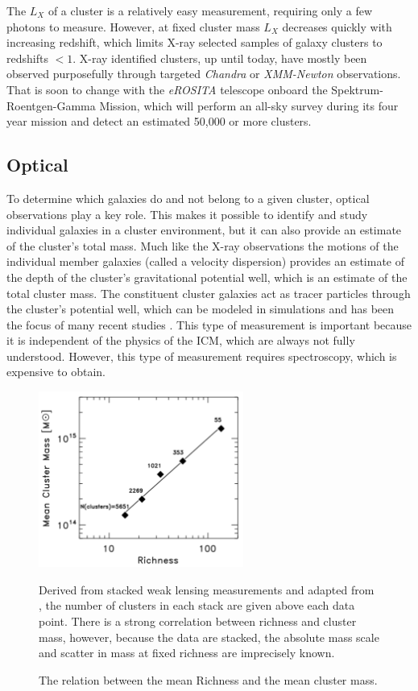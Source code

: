 The $L_X$ of a cluster is a relatively easy measurement, requiring only a few photons to measure. However, at fixed cluster mass $L_X$ decreases quickly with increasing redshift, which limits X-ray selected samples of galaxy clusters to redshifts $< 1$. X-ray identified clusters, up until today, have mostly been observed purposefully through targeted \textit{Chandra} or \textit{XMM-Newton} observations. That is soon to change with the \textit{eROSITA} \citep{Pillepich2012} telescope onboard the Spektrum-Roentgen-Gamma Mission, which will perform an all-sky survey during its four year mission and detect an estimated 50,000 or more clusters.

\subsection{Optical}
To determine which galaxies do and not belong to a given cluster, optical observations play a key role. This makes it possible to identify and study individual galaxies in a cluster environment, but it can also provide an estimate of the cluster's total mass. Much like the X-ray observations the motions of the individual member galaxies (called a velocity dispersion) provides an estimate of the depth of the cluster's gravitational potential well, which is an estimate of the total cluster mass. The constituent cluster galaxies act as tracer particles through the cluster's potential well, which can be modeled in simulations and has been the focus of many recent studies . This type of measurement is important because it is independent of the physics of the ICM, which are always not fully understood. However, this type of measurement requires spectroscopy, which is expensive to obtain. 

\begin{figure}[t]
	\begin{center}
		\includegraphics[width=0.6\textwidth]{figures/massrichness.pdf}
	\end{center}
	\caption{The relation between the mean Richness and the mean cluster mass.} 
	Derived from stacked weak lensing measurements and adapted from \citealt{Rozo2010}, the number of clusters in each stack are given above each data point. There is a strong correlation between richness and cluster mass, however, because the data are stacked, the absolute mass scale and scatter in mass at fixed richness are imprecisely known.
	\label{fig:massrichness}
\end{figure}

